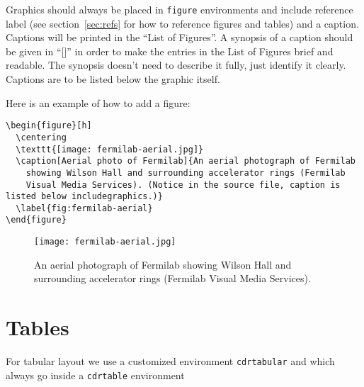 Graphics should always be placed in \texttt{figure} environments and
include reference label (see section~\ref{sec:refs} for how to
reference figures and tables) and a caption.
Captions will be printed in the ``List of Figures''.
A synopsis of a caption should be given in ``[]'' in order to make the
entries in the List of Figures brief and readable.
The synopsis doesn't need to describe it fully, just identify it
clearly. Captions are to be listed below the graphic itself.

Here is an example of how to add a figure:

\begin{verbatim}
\begin{figure}[h]
  \centering
  \texttt{[image: fermilab-aerial.jpg]}
  \caption[Aerial photo of Fermilab]{An aerial photograph of Fermilab
    showing Wilson Hall and surrounding accelerator rings (Fermilab
    Visual Media Services). (Notice in the source file, caption is listed below includegraphics.)}
  \label{fig:fermilab-aerial}
\end{figure}
\end{verbatim}

\begin{figure}[h]
  \centering
  \texttt{[image: fermilab-aerial.jpg]}
  \caption[Aerial Photo of Fermilab]{An aerial photograph of Fermilab
    showing Wilson Hall and surrounding accelerator rings (Fermilab
    Visual Media Services).}
  \label{fig:fermilab-aerial}
\end{figure}

\section{Tables}
\label{sec:tables}

For tabular layout we use a customized environment \texttt{cdrtabular}
and which always go inside a \texttt{cdrtable} environment

